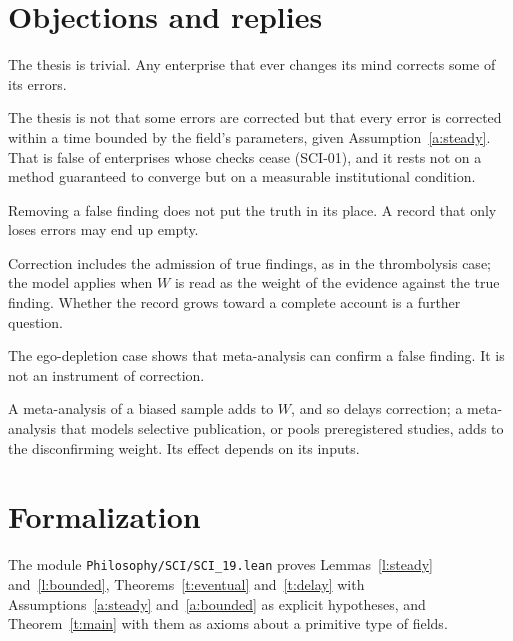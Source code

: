 \documentclass{situationist-preprint}
\begin{document}
\section{Objections and replies}

\begin{objection}
The thesis is trivial. Any enterprise that ever changes its mind corrects some of its errors.
\end{objection}

\begin{reply}
The thesis is not that some errors are corrected but that every error is corrected within a time bounded by the field's parameters, given Assumption~\ref{a:steady}. That is false of enterprises whose checks cease (SCI-01), and it rests not on a method guaranteed to converge but on a measurable institutional condition.
\end{reply}

\begin{objection}
Removing a false finding does not put the truth in its place. A record that only loses errors may end up empty.
\end{objection}

\begin{reply}
Correction includes the admission of true findings, as in the thrombolysis case; the model applies when $W$ is read as the weight of the evidence against the true finding. Whether the record grows toward a complete account is a further question.
\end{reply}

\begin{objection}
The ego-depletion case shows that meta-analysis can confirm a false finding. It is not an instrument of correction.
\end{objection}

\begin{reply}
A meta-analysis of a biased sample adds to $W$, and so delays correction; a meta-analysis that models selective publication, or pools preregistered studies, adds to the disconfirming weight. Its effect depends on its inputs.
\end{reply}

\section{Formalization}

The module \nolinkurl{Philosophy/SCI/SCI_19.lean} proves Lemmas~\ref{l:steady} and~\ref{l:bounded}, Theorems~\ref{t:eventual} and~\ref{t:delay} with Assumptions~\ref{a:steady} and~\ref{a:bounded} as explicit hypotheses, and Theorem~\ref{t:main} with them as axioms about a primitive type of fields.
\end{document}
